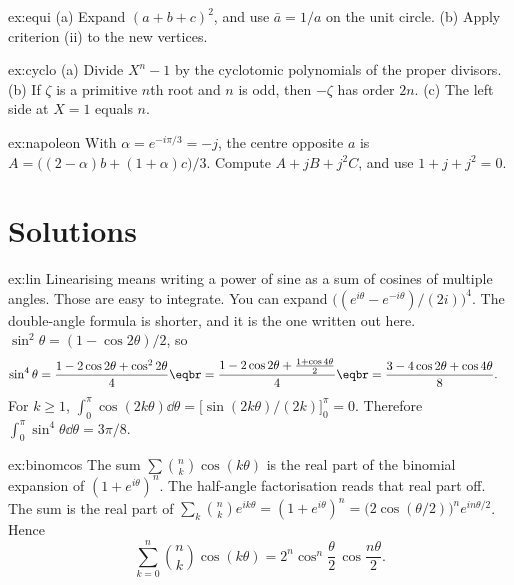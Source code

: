 \begin{hint}{ex:equi}
(a) Expand $(a+b+c)^2$, and use $\bar a=1/a$ on the unit circle. (b) Apply criterion (ii) to the new vertices.
\end{hint}
\begin{hint}{ex:cyclo}
(a) Divide $X^n-1$ by the cyclotomic polynomials of the proper divisors. (b) If $\zeta$ is a primitive $n$th root and $n$ is odd, then $-\zeta$ has order $2n$. (c) The left side at $X=1$ equals $n$.
\end{hint}
\begin{hint}{ex:napoleon}
With $\alpha=e^{-i\pi/3}=-j$, the centre opposite $a$ is $A=\bigl((2-\alpha)b+(1+\alpha)c\bigr)/3$. Compute $A+jB+j^2C$, and use $1+j+j^2=0$.
\end{hint}
\section{Solutions}

\begin{solution}{ex:lin}
\idea Linearising means writing a power of sine as a sum of cosines of multiple angles. Those are easy to integrate. You can expand $\bigl((e^{i\theta}-e^{-i\theta})/(2i)\bigr)^4$. The double-angle formula is shorter, and it is the one written out here.
\writeup $\sin^2\theta=(1-\cos2\theta)/2$, so
\begin{align*}
\sin^4\theta&=\frac{1-2\cos2\theta+\cos^22\theta}4\eqbr=\frac{1-2\cos2\theta+\frac{1+\cos4\theta}2}4\eqbr=\frac{3-4\cos2\theta+\cos4\theta}8.
\end{align*}
For $k\ge1$, $\int_0^\pi\cos(2k\theta)\dd\theta=\bigl[\sin(2k\theta)/(2k)\bigr]_0^\pi=0$. Therefore $\int_0^\pi\sin^4\theta\dd\theta=3\pi/8$.
\end{solution}

\begin{solution}{ex:binomcos}
\idea The sum $\sum\binom nk\cos(k\theta)$ is the real part of the binomial expansion of $(1+e^{i\theta})^n$. The half-angle factorisation reads that real part off.
\writeup The sum is the real part of $\sum_k\binom nk e^{ik\theta}=(1+e^{i\theta})^n=\bigl(2\cos(\theta/2)\bigr)^n e^{in\theta/2}$. Hence
\[
\sum_{k=0}^n\binom nk\cos(k\theta)=2^n\cos^n\frac\theta2\,\cos\frac{n\theta}2.
\]
\end{solution}

